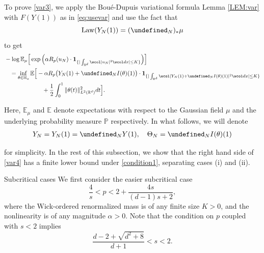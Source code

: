 \documentclass[%
11pt,  reqno]{amsart}
\makeatletter
\theoremstyle{remarkstyle}
\newcommand{\1}{\hspace{0.2mm}\text{I}\hspace{0.2mm}}
\newcommand{\noi}{\noindent}
\newcommand{\R}{\mathbb{R}}
\let\P= \undefined
\newcommand{\P}{\mathbf{P}}
\newcommand{\E}{\mathbb{E}}
\newcommand{\al}{\alpha}
\newcommand{\wick}[1]{\wcol#1\wcol}
\newcommand{\ind}{\mathbf 1}
\numberwithin{equation}{section}
\numberwithin{theorem}{section}
\def\subsubsection{\@startsection{subsubsection}{3}%
	\z@{.5\linespacing\@plus.7\linespacing}{-.5em}%
	{\normalfont\bfseries}}
\makeatother
\begin{document}
	\noi
	To prove \eqref{var3}, we apply the Bou\'e-Dupuis variational formula Lemma \ref{LEM:var} with $F(Y(1))$ as in \eqref{eq:usevar} and use the fact that 
	$$\textup{Law}(Y_N(1)) = (\P_N)_*\mu$$ 
	to get
	\begin{align}
		\label{var4}
		\begin{split}
			& -  \log  \E_{\mu}  \Big[ \exp \Big(\al R_p(u_N) \cdot  \ind_{\{ | \int_{\R^d} \wick{|u_N |^2} dx| \le K\}}  \Big)\Big]\\
			&\hphantom{X} = \inf_{\theta \in \mathbb{H}_a} \E \Big[ - \al R_p \big( Y_N(1)+ \P_{N} I(\theta) (1) \big) 
			\cdot  \ind_{\{ | \int_{\R^d} \wick{| Y_N(1)  + \P_{N} I(\theta) (1) |^2} dx|  \le K \}} \\
			& \hphantom{XXXXXXX} + \frac12 \int_0^1 
			\| \theta (t) \|_{L^2(\R^d)}^2 dt  \Big].
		\end{split}
	\end{align}
	
	\noi 
	Here, $\E_{\mu}$ and $\E$ denote expectations with respect to the Gaussian field $\mu$ and the underlying probability measure $\mathbb P$ respectively.
	In what follows, we will denote
	\begin{align}  
		Y_N = Y_N(1)=\P_N Y(1), \quad \Theta_N = \P_{N} I(\theta)(1)
		\label{nots}
	\end{align}
	
	\noi 
	for simplicity.
	In the rest of this subsection, 
	we show that the right hand side of \eqref{var4} 
	has a finite lower bound under \eqref{condition1}, separating cases (i) and (ii).
	
	\medskip
	
	\subsubsection{Subcritical cases}
	We first consider the easier subcritical case 
	$$\frac{4}{s} < p < 2 + \frac{4s}{(d-1)s+2},$$ 
	where the Wick-ordered renormalized mass is of any finite size $K>0$, and the nonlinearity is of any magnitude $\al>0$.
	Note that the condition on $p$ coupled with $s<2$ implies 
	$$\frac{d-2+\sqrt{d^2+8}}{d+1}<s<2.$$
	
	
	
\end{document}
